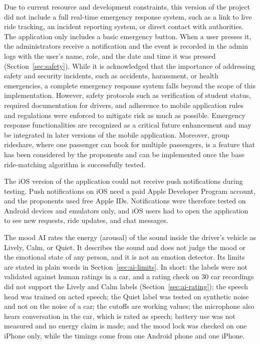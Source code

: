Due to current resource and development constraints, this version of the project did not include a full real-time emergency response system, such as a link to live ride tracking, an incident reporting system, or direct contact with authorities. The application only includes a basic emergency button. When a user presses it, the administrators receive a notification and the event is recorded in the admin logs with the user's name, role, and the date and time it was pressed (Section~\ref{sec:safety}). While it is acknowledged that the importance of addressing safety and security incidents, such as accidents, harassment, or health emergencies, a complete emergency response system falls beyond the scope of this implementation. However, safety protocols such as verification of student status, required documentation for drivers, and adherence to mobile application rules and regulations were enforced to mitigate risk as much as possible. Emergency response functionalities are recognized as a critical future enhancement and may be integrated in later versions of the mobile application. Moreover, group rideshare, where one passenger can book for multiple passengers, is a feature that has been considered by the proponents and can be implemented once the base ride-matching algorithm is successfully tested.

The iOS version of the application could not receive push notifications during testing. Push notifications on iOS need a paid Apple Developer Program account, and the proponents used free Apple IDs. Notifications were therefore tested on Android devices and emulators only, and iOS users had to open the application to see new requests, ride updates, and chat messages.

The mood AI rates the energy (arousal) of the sound inside the driver's vehicle as Lively, Calm, or Quiet. It describes the sound and does not judge the mood or the emotional state of any person, and it is not an emotion detector. Its limits are stated in plain words in Section~\ref{sec:ai-limits}. In short: the labels were not validated against human ratings in a car, and a rating check on 30 car recordings did not support the Lively and Calm labels (Section~\ref{sec:ai-rating}); the speech head was trained on acted speech; the Quiet label was tested on synthetic noise and not on the noise of a car; the cutoffs are working values; the microphone also hears conversation in the car, which is rated as speech; battery use was not measured and no energy claim is made; and the mood lock was checked on one iPhone only, while the timings come from one Android phone and one iPhone.


